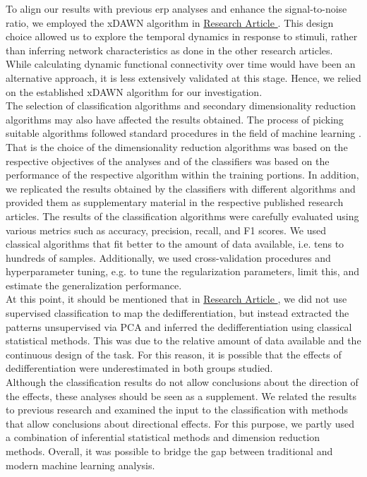 To align our results with previous \gls{erp} analyses and enhance the signal-to-noise ratio, we employed the xDAWN algorithm in \hyperref[results:paperIV]{Research Article }. This design choice allowed us to explore the temporal dynamics in response to stimuli, rather than inferring network characteristics as done in the other research articles. While calculating dynamic functional connectivity over time would have been an alternative approach, it is less extensively validated at this stage. Hence, we relied on the established xDAWN algorithm for our investigation.\\
The selection of classification algorithms and secondary dimensionality reduction algorithms may also have affected the results obtained. The process of picking suitable algorithms followed standard procedures in the field of machine learning \cite{Shalev2014}. That is the choice of the dimensionality reduction algorithms was based on the respective objectives of the analyses and of the classifiers was based on the performance of the respective algorithm within the training portions. In addition, we replicated the results obtained by the classifiers with different algorithms and provided them as supplementary material in the respective published research articles. The results of the classification algorithms were carefully evaluated using various metrics such as accuracy, precision, recall, and F1 scores. We used classical algorithms that fit better to the amount of data available, i.e. tens to hundreds of samples. Additionally, we used cross-validation procedures and hyperparameter tuning, e.g. to tune the regularization parameters, limit this, and estimate the generalization performance.\\
At this point, it should be mentioned that in \hyperref[results:paperIII]{Research Article }, we did not use supervised classification to map the dedifferentiation, but instead extracted the patterns unsupervised via PCA and inferred the dedifferentiation using classical statistical methods. This was due to the relative amount of data available and the continuous design of the task. For this reason, it is possible that the effects of dedifferentiation were underestimated in both groups studied.\\
Although the classification results do not allow conclusions about the direction of the effects, these analyses should be seen as a supplement. We related the results to previous research and examined the input to the classification with methods that allow conclusions about directional effects. For this purpose, we partly used a combination of inferential statistical methods and dimension reduction methods. Overall, it was possible to bridge the gap between traditional and modern machine learning analysis.

